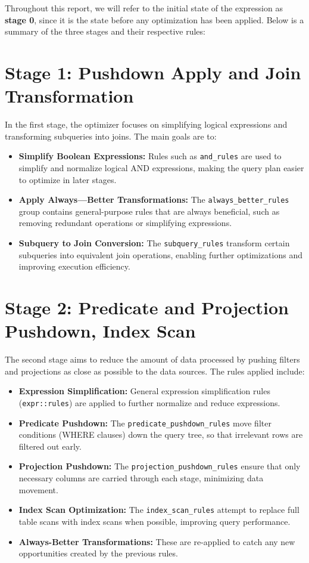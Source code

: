 \documentclass[a4paper,12pt]{scrreprt}
\begin{document}
Throughout this report, we will refer to the initial state of the expression as \textbf{stage 0}, since it is the state before any optimization has been applied.
Below is a summary of the three stages and their respective rules:

\section{Stage 1: Pushdown Apply and Join Transformation}
In the first stage, the optimizer focuses on simplifying logical expressions and transforming subqueries into joins. The main goals are to:
\begin{itemize}
    \item \textbf{Simplify Boolean Expressions:} Rules such as \texttt{and\_rules} are used to simplify and normalize logical AND expressions, making the query plan easier to optimize in later stages.
    \item \textbf{Apply Always---Better Transformations:} The \texttt{always\_better\_rules} group contains general-purpose rules that are always beneficial, such as removing redundant operations or simplifying expressions.
    \item \textbf{Subquery to Join Conversion:} The \texttt{subquery\_rules} transform certain subqueries into equivalent join operations, enabling further optimizations and improving execution efficiency.
\end{itemize}

\section{Stage 2: Predicate and Projection Pushdown, Index Scan}
The second stage aims to reduce the amount of data processed by pushing filters and projections as close as possible to the data sources. The rules applied include:
\begin{itemize}
    \item \textbf{Expression Simplification:} General expression simplification rules (\texttt{expr::rules}) are applied to further normalize and reduce expressions.
    \item \textbf{Predicate Pushdown:} The \texttt{predicate\_pushdown\_rules} move filter conditions (WHERE clauses) down the query tree, so that irrelevant rows are filtered out early.
    \item \textbf{Projection Pushdown:} The \texttt{projection\_pushdown\_rules} ensure that only necessary columns are carried through each stage, minimizing data movement.
    \item \textbf{Index Scan Optimization:} The \texttt{index\_scan\_rules} attempt to replace full table scans with index scans when possible, improving query performance.
    \item \textbf{Always-Better Transformations:} These are re-applied to catch any new opportunities created by the previous rules.
\end{itemize}
\end{document}
